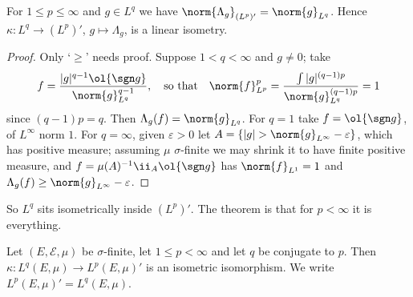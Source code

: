 \begin{lemma}\label{lem:isometricdual}
	For $1 \le p \le \infty$ and $g \in L^q$ we have $\norm{\Lambda_g}_{(L^p)'} = \norm{g}_{L^q}$. Hence $\kappa : L^q \to (L^p)'$, $g \mapsto \Lambda_g$, is a linear isometry.
\end{lemma}

\begin{proof}
	Only `$\ge$' needs proof. Suppose $1 < q < \infty$ and $g \ne 0$; take
	$$f = \frac{|g|^{q-1}\ol{\sgn g}}{\norm{g}_{L^q}^{q-1}}, \quad \text{so that} \quad \norm{f}_{L^p}^p = \frac{\int |g|^{(q-1)p}}{\norm{g}^{(q-1)p}_{L^q}} = 1$$
	since $(q-1)p = q$. Then $\Lambda_g(f) = \norm{g}_{L^q}$. For $q = 1$ take $f = \ol{\sgn g}$, of $L^\infty$ norm $1$. For $q = \infty$, given $\varepsilon > 0$ let $A = \{|g| > \norm{g}_{L^\infty} - \varepsilon\}$, which has positive measure; assuming $\mu$ $\sigma$-finite we may shrink it to have finite positive measure, and $f = \mu(A)^{-1}\ii_A \ol{\sgn g}$ has $\norm{f}_{L^1} = 1$ and $\Lambda_g(f) \ge \norm{g}_{L^\infty}-\varepsilon$.
\end{proof}

So $L^q$ sits isometrically inside $(L^p)'$. The theorem is that for $p < \infty$ it is everything.

\begin{theorem}\label{thm:lpdual}
	Let $(E, \mathcal{E},\mu)$ be $\sigma$-finite, let $1 \le p < \infty$ and let $q$ be conjugate to $p$. Then $\kappa : L^q(E,\mu) \to L^p(E,\mu)'$ is an isometric isomorphism. We write $L^p(E,\mu)' = L^q(E,\mu)$.
\end{theorem}

